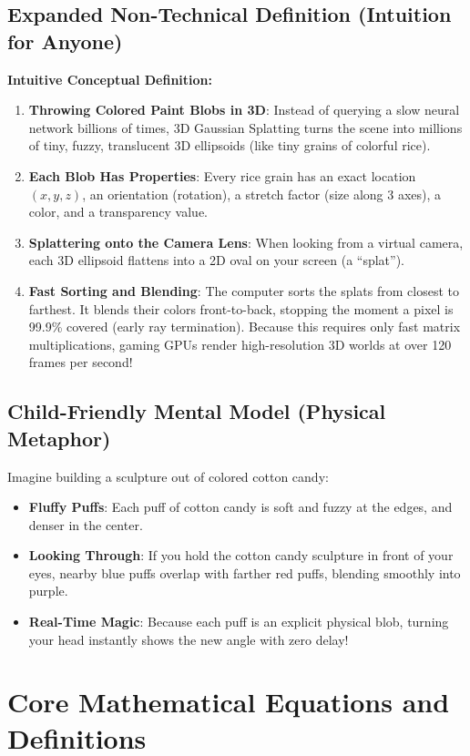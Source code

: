 \documentclass[11pt,a4paper]{article}
\theoremstyle{definition}
\begin{document}
\subsection{Expanded Non-Technical Definition (Intuition for Anyone)}
\textbf{Intuitive Conceptual Definition:}
\begin{enumerate}
    \item \textbf{Throwing Colored Paint Blobs in 3D}: Instead of querying a slow neural network billions of times, 3D Gaussian Splatting turns the scene into millions of tiny, fuzzy, translucent 3D ellipsoids (like tiny grains of colorful rice).
    \item \textbf{Each Blob Has Properties}: Every rice grain has an exact location $(x, y, z)$, an orientation (rotation), a stretch factor (size along 3 axes), a color, and a transparency value.
    \item \textbf{Splattering onto the Camera Lens}: When looking from a virtual camera, each 3D ellipsoid flattens into a 2D oval on your screen (a ``splat'').
    \item \textbf{Fast Sorting and Blending}: The computer sorts the splats from closest to farthest. It blends their colors front-to-back, stopping the moment a pixel is 99.9\% covered (early ray termination). Because this requires only fast matrix multiplications, gaming GPUs render high-resolution 3D worlds at over 120 frames per second!
\end{enumerate}

\subsection{Child-Friendly Mental Model (Physical Metaphor)}
Imagine building a sculpture out of colored cotton candy:
\begin{itemize}
    \item \textbf{Fluffy Puffs}: Each puff of cotton candy is soft and fuzzy at the edges, and denser in the center.
    \item \textbf{Looking Through}: If you hold the cotton candy sculpture in front of your eyes, nearby blue puffs overlap with farther red puffs, blending smoothly into purple.
    \item \textbf{Real-Time Magic}: Because each puff is an explicit physical blob, turning your head instantly shows the new angle with zero delay!
\end{itemize}

\section{Core Mathematical Equations and Definitions}
\end{document}
